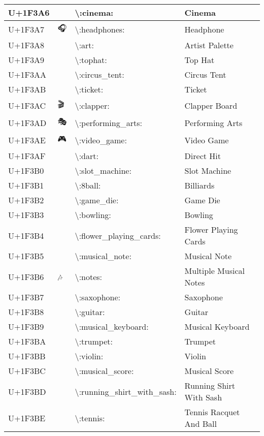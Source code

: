 \begin{table}[h]
\begin{tabulary}{\linewidth}{|L|L|L|L|}
\hline
U+1F3A6 & 🎦 & {\textbackslash}:cinema: & Cinema \\
\hline
U+1F3A7 & 🎧 & {\textbackslash}:headphones: & Headphone \\
\hline
U+1F3A8 & 🎨 & {\textbackslash}:art: & Artist Palette \\
\hline
U+1F3A9 & 🎩 & {\textbackslash}:tophat: & Top Hat \\
\hline
U+1F3AA & 🎪 & {\textbackslash}:circus\_tent: & Circus Tent \\
\hline
U+1F3AB & 🎫 & {\textbackslash}:ticket: & Ticket \\
\hline
U+1F3AC & 🎬 & {\textbackslash}:clapper: & Clapper Board \\
\hline
U+1F3AD & 🎭 & {\textbackslash}:performing\_arts: & Performing Arts \\
\hline
U+1F3AE & 🎮 & {\textbackslash}:video\_game: & Video Game \\
\hline
U+1F3AF & 🎯 & {\textbackslash}:dart: & Direct Hit \\
\hline
U+1F3B0 & 🎰 & {\textbackslash}:slot\_machine: & Slot Machine \\
\hline
U+1F3B1 & 🎱 & {\textbackslash}:8ball: & Billiards \\
\hline
U+1F3B2 & 🎲 & {\textbackslash}:game\_die: & Game Die \\
\hline
U+1F3B3 & 🎳 & {\textbackslash}:bowling: & Bowling \\
\hline
U+1F3B4 & 🎴 & {\textbackslash}:flower\_playing\_cards: & Flower Playing Cards \\
\hline
U+1F3B5 & 🎵 & {\textbackslash}:musical\_note: & Musical Note \\
\hline
U+1F3B6 & 🎶 & {\textbackslash}:notes: & Multiple Musical Notes \\
\hline
U+1F3B7 & 🎷 & {\textbackslash}:saxophone: & Saxophone \\
\hline
U+1F3B8 & 🎸 & {\textbackslash}:guitar: & Guitar \\
\hline
U+1F3B9 & 🎹 & {\textbackslash}:musical\_keyboard: & Musical Keyboard \\
\hline
U+1F3BA & 🎺 & {\textbackslash}:trumpet: & Trumpet \\
\hline
U+1F3BB & 🎻 & {\textbackslash}:violin: & Violin \\
\hline
U+1F3BC & 🎼 & {\textbackslash}:musical\_score: & Musical Score \\
\hline
U+1F3BD & 🎽 & {\textbackslash}:running\_shirt\_with\_sash: & Running Shirt With Sash \\
\hline
U+1F3BE & 🎾 & {\textbackslash}:tennis: & Tennis Racquet And Ball \\

\end{tabulary}
\end{table}
